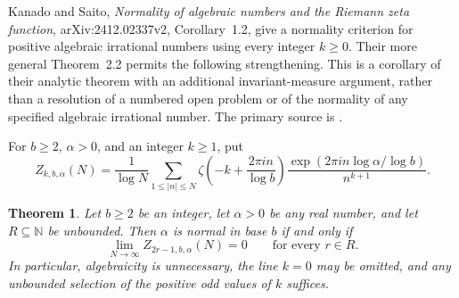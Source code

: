 \documentclass[11pt,a4paper]{article}
\newtheorem{theorem}{Theorem}[section]
\theoremstyle{definition}
\theoremstyle{remark}
\numberwithin{equation}{section}
\begin{document}
Kanado and Saito, \emph{Normality of algebraic numbers and the Riemann zeta
function}, arXiv:2412.02337v2, Corollary~1.2, give a normality criterion for
positive algebraic irrational numbers using every integer $k\geq0$.
Their more general Theorem~2.2 permits the following strengthening.  This
is a corollary of their analytic theorem with an additional invariant-measure
argument, rather than a resolution of a numbered open problem or of the
normality of any specified algebraic irrational number.
The primary source is \cite{KanadoSaitoNormality}.

For $b\geq2$, $\alpha>0$, and an integer $k\geq1$, put
\[
 Z_{k,b,\alpha}(N)=\frac1{\log N}
 \sum_{1\leq|n|\leq N}
 \zeta\!\left(-k+\frac{2\pi i n}{\log b}\right)
 \frac{\exp(2\pi i n\log\alpha/\log b)}{n^{k+1}}.
\]

\begin{theorem}\label{sur:thm:sparse-normality}
Let $b\geq2$ be an integer, let $\alpha>0$ be any real number, and let
$R\subseteq\mathbb N$ be unbounded.  Then $\alpha$ is normal in base $b$
if and only if
\[
 \lim_{N\to\infty}Z_{2r-1,b,\alpha}(N)=0
 \qquad\text{for every }r\in R.
\]
In particular, algebraicity is unnecessary, the line $k=0$ may be omitted,
and any unbounded selection of the positive odd values of $k$ suffices.
\end{theorem}
\end{document}
